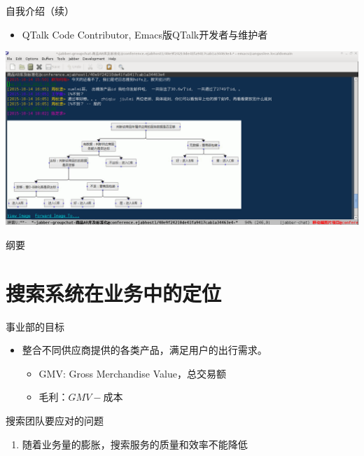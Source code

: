 \documentclass{beamer}
\begin{document}
\begin{CJK}{UTF8}{gbsn}
\begin{frame}{自我介绍（续）}
  \begin{itemize}
  \item {QTalk Code Contributor, Emacs版QTalk开发者与维护者}
  \end{itemize}
  \begin{center}
    \includegraphics[scale=0.3]{./images/qtalk-emacs-screenshot}
  \end{center}
\end{frame}

\begin{frame}{纲要}
  \tableofcontents
\end{frame}

\section{搜索系统在业务中的定位}


\begin{frame}{事业部的目标}
  \begin{itemize}
  \item { 整合不同供应商提供的各类产品，满足用户的出行需求。
    \begin{itemize}
      \item<2-> { GMV: Gross Merchandise Value，总交易额 }
      \item<2-> { 毛利：$GMV - \text{成本} $ }
    \end{itemize}
  }
  \end{itemize}
\end{frame}

\begin{frame}{搜索团队要应对的问题}
  \begin{enumerate}
    \item { 随着业务量的膨胀，搜索服务的质量和效率不能降低 }
  \end{enumerate}
   {
    \begin{center}
      \plotGMVGrowthChart[scale=0.65]
    \end{center}
  }
\end{frame}



\end{CJK}
\end{document}
